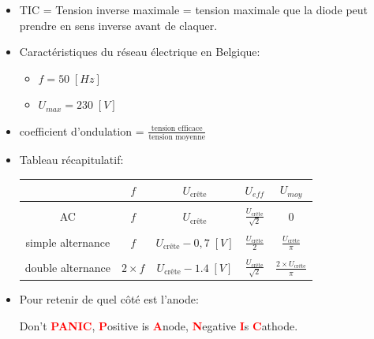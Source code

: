 \documentclass[a4paper]{article}
\begin{document}
\begin{itemize}


\item TIC = Tension inverse maximale = tension maximale que la diode peut prendre en sens inverse avant de claquer.


\item Caractéristiques du réseau électrique en Belgique:
\begin{itemize}
    \item $ f = 50 \; [Hz] $
    \item $ U_{max} = 230 \; [V] $
\end{itemize}


\item coefficient d'ondulation = $\displaystyle \frac{\text{tension efficace}}{\text{tension moyenne}} $


\item Tableau récapitulatif:
\begin{center}
    \begin{tabular}{c|c|c|c|c}
        & $ f $ & $ U_{\text{crête}} $ & $ U_{eff} $ & $ U_{moy} $ \\ \hline
        &&&& \\
        AC & $ f $ & $ U_{\text{crête}} $ & $\displaystyle \frac{U_{\text{crête}}}{\sqrt{2}} $ & $ 0 $ \\
        &&&& \\
        simple alternance & $ f $ & $ U_{\text{crête}} - 0,7 \; [V] $ & $\displaystyle \frac{U_{\text{crête}}}{2} $ & $\displaystyle \frac{U_{\text{crête}}}{\pi} $ \\
        &&&& \\
        double alternance & $ 2 \times f $ & $\displaystyle U_{\text{crête}} - 1.4 \; [V] $ & $\displaystyle \frac{U_{\text{crête}}}{\sqrt{2}} $ & $\displaystyle \frac{2 \times U_{\text{crête}}}{\pi} $
    \end{tabular}
\end{center}


\item Pour retenir de quel côté est l'anode:
\begin{center}
    Don't \textcolor{red}{\textbf{PANIC}}, \textcolor{red}{\textbf{P}}ositive is \textcolor{red}{\textbf{A}}node, \textcolor{red}{\textbf{N}}egative \textcolor{red}{\textbf{I}}s \textcolor{red}{\textbf{C}}athode.
\end{center}


\end{itemize}
\end{document}
